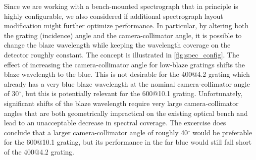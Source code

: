 Since we are working with a bench-mounted spectrograph that in
principle is highly configurable, we also considered if additional
spectrograph layout modification might further optimize
performance. In particular, by altering both the grating (incidence)
angle and the camera-collimator angle, it is possible to change the
blaze wavelength while keeping the wavelength coverage on the detector
roughly constant. The concept is illustrated in \ref{fig:spec_config}.
The effect of increasing the camera-collimator angle for low-blaze
gratings shifts the blaze wavelength to the blue. This is not
desirable for the 400@4.2 grating which already has a very blue blaze
wavelength at the nominal camera-collimator angle of 30$^{\circ}$, but
this is potentially relevant for the 600@10.1 grating. Unfortunately,
significant shifts of the blaze wavelength require very large
camera-collimator angles that are both geometrically impractical on
the existing optical bench and lead to an unacceptable decrease in
spectral coverage. The excercise does conclude that a larger
camera-collimator angle of roughly 40$^{\circ}$ would be preferable
for the 600@10.1 grating, but its performance in the far blue would
still fall short of the 400@4.2 grating.